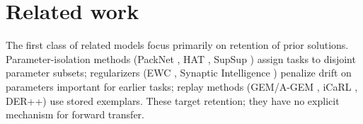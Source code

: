 \documentclass{article}
\begin{document}

\section{Related work}\label{sec:related}

The first class of related models focus primarily on retention of prior solutions. Parameter-isolation methods (PackNet \citep{mallya2018packnet}, HAT \citep{serra2018overcoming}, SupSup \citep{wortsman2020supermasks}) assign tasks to disjoint parameter subsets; regularizers (EWC \citep{kirkpatrick2017overcoming}, Synaptic Intelligence \citep{zenke2017continual}) penalize drift on parameters important for earlier tasks; replay methods (GEM/A-GEM \citep{lopez2017gradient,chaudhry2018efficient}, iCaRL \citep{rebuffi2017icarl}, DER++) use stored exemplars. These target retention; they have no explicit mechanism for forward transfer.
\end{document}
